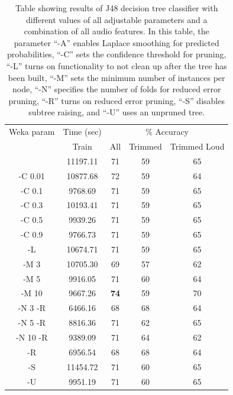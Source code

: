 \documentclass[12pt,oneside]{book}
\begin{document}
\begin{table}
\begin{tabular}{|c|c|c|c|c|}
\hline
\multicolumn{1}{|c|}{Weka param} & \multicolumn{1}{c|}{Time (sec)} & \multicolumn{3}{c|}{\% Accuracy} \\
\hhline{|-|-|-|-|-|}
  & Train & All & Trimmed & Trimmed Loud \\
\hhline{|=|=|=|=|=|}
           &    11197.11  &    71  & 59 & 65 \\
 -C 0.01   &    10877.68  &    72  & 59 & 64 \\
 -C 0.1    &     9768.69  &    71  & 59 & 65 \\
 -C 0.3    &    10193.41  &    71  & 59 & 65 \\
 -C 0.5    &     9939.26  &    71  & 59 & 65 \\
 -C 0.9    &     9766.73  &    71  & 59 & 65 \\
\hline
 -L        &    10674.71  &    71  & 59 & 65 \\
 -M 3      &    10705.30  &    69  & 57 & 62 \\
 -M 5      &     9916.05  &    71  & 60 & 64 \\
 -M 10     &     9667.26  &    \textbf{74}  & 59 & 70 \\
 -N 3 -R   &     6466.16  &    68  & 68 & 64 \\
 -N 5 -R   &     8816.36  &    71  & 62 & 65 \\
 -N 10 -R  &     9389.09  &    71  & 64 & 62 \\
\hline
 -R        &     6956.54  &    68  & 68 & 64 \\
 -S        &    11454.72  &    71  & 60 & 65 \\
 -U        &     9951.19  &    71  & 60 & 65\\
\hline
\end{tabular}
\caption{Table showing results of J48 decision
  tree classifier with different values of all adjustable parameters
  and a combination of all audio features.  In this table, the
  parameter ``-A'' enables Laplace smoothing for predicted
  probabilities, ``-C'' sets the confidence threshold for pruning,
  ``-L'' turns on functionality to not clean up after the tree has
  been built, ``-M'' sets the minimum number of instances per node,
  ``-N'' specifies the number of folds for reduced error pruning,
  ``-R'' turns on reduced error pruning, ``-S'' disables subtree
  raising, and ``-U'' uses an unpruned tree.}
\label{table:calls-weka-j48}
\end{table}
\end{document}

